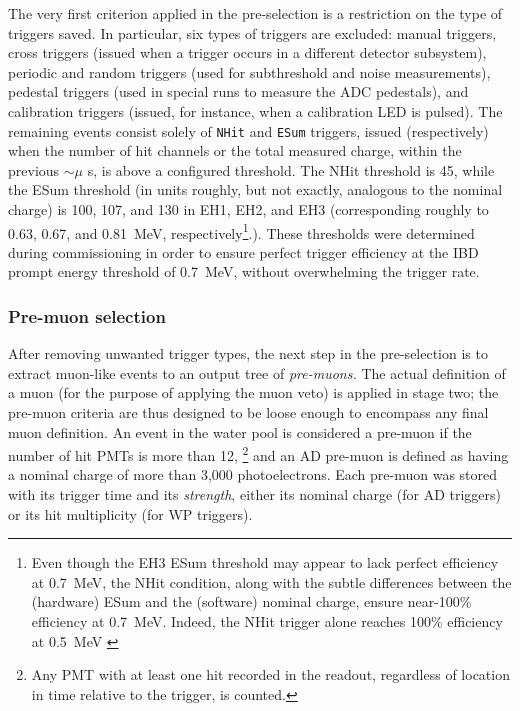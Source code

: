 \documentclass[../thesis.tex]{subfiles}
\begin{document}
The very first criterion applied in the pre-selection is a restriction on the type of triggers saved. In particular, six types of triggers are excluded: manual triggers, cross triggers (issued when a trigger occurs in a different detector subsystem), periodic and random triggers (used for subthreshold and noise measurements), pedestal triggers (used in special runs to measure the ADC pedestals), and calibration triggers (issued, for instance, when a calibration LED is pulsed). The remaining events consist solely of \texttt{NHit} and \texttt{ESum} triggers, issued (respectively) when the number of hit channels or the total measured charge, within the previous $\sim\mu$ s, is above a configured threshold. The NHit threshold is 45, while the ESum threshold (in units roughly, but not exactly, analogous to the nominal charge) is 100, 107, and 130 in EH1, EH2, and EH3 (corresponding roughly to 0.63, 0.67, and 0.81~MeV, respectively\footnote{Even though the EH3 ESum threshold may appear to lack perfect efficiency at 0.7~MeV, the NHit condition, along with the subtle differences between the (hardware) ESum and the (software) nominal charge, ensure near-100\% efficiency at 0.7~MeV. Indeed, the NHit trigger alone reaches 100\% efficiency at 0.5~MeV \cite{weili_trig_eff}}.). These thresholds were determined during commissioning in order to ensure perfect trigger efficiency at the IBD prompt energy threshold of 0.7~MeV, without overwhelming the trigger rate.

\subsubsection{Pre-muon selection}
\label{sec:selPreMuons}

After removing unwanted trigger types, the next step in the pre-selection is to extract muon-like events to an output tree of \emph{pre-muons.} The actual definition of a muon (for the purpose of applying the muon veto) is applied in stage two; the pre-muon criteria are thus designed to be loose enough to encompass any final muon definition. An event in the water pool is considered a pre-muon if the number of hit PMTs is more than 12,%
\footnote{Any PMT with at least one hit recorded in the readout, regardless of location in time relative to the trigger, is counted.}%
and an AD pre-muon is defined as having a nominal charge of more than 3,000 photoelectrons.
Each pre-muon was stored with its trigger time and its \emph{strength}, either its nominal charge (for AD triggers) or its hit multiplicity (for WP triggers).
\end{document}
